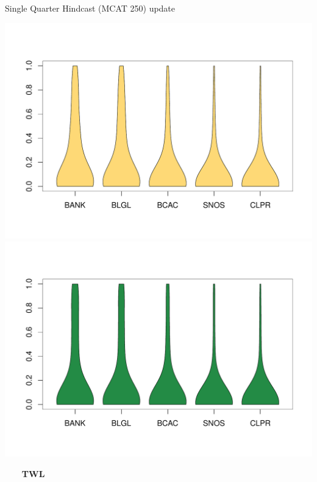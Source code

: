 \documentclass[ xcolor = pdftex, dvipsnames, table ]{beamer}
\begin{document}
\begin{frame}{Single Quarter Hindcast (MCAT 250) {\color{red} update}}
\begin{minipage}{0.29\textwidth}
\includegraphics[height=0.36\textheight]{../pictures/vioStarOLANET.pdf}\\
\vspace*{-1.3cm}
\includegraphics[height=0.36\textheight]{../pictures/vioStarOSDNET.pdf}
\end{minipage}
\hspace*{0.5cm}
\begin{minipage}{0.29\textwidth}
\begin{center}
$~~~~~~~~~$\textbf{TWL}
\end{center}
\vspace*{-0.75cm}

\end{minipage}
\end{frame}
\end{document}
